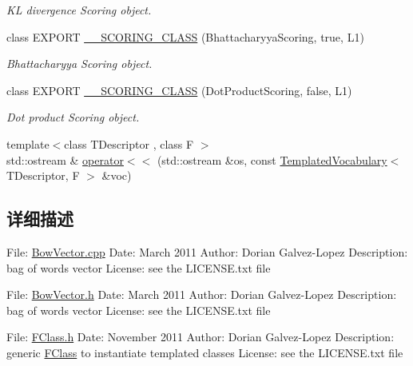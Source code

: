\begin{DoxyCompactItemize}
\begin{DoxyCompactList}\small\item\em K\-L divergence Scoring object. \end{DoxyCompactList}\item 
\hypertarget{namespaceDBoW2_a7135fab6a887afb7d2b4e6254b4875ea}{class E\-X\-P\-O\-R\-T \hyperlink{namespaceDBoW2_a7135fab6a887afb7d2b4e6254b4875ea}{\-\_\-\-\_\-\-S\-C\-O\-R\-I\-N\-G\-\_\-\-C\-L\-A\-S\-S} (Bhattacharyya\-Scoring, true, L1)}\label{namespaceDBoW2_a7135fab6a887afb7d2b4e6254b4875ea}

\begin{DoxyCompactList}\small\item\em Bhattacharyya Scoring object. \end{DoxyCompactList}\item 
\hypertarget{namespaceDBoW2_a8b3715c76bccab82aa18804b6b7dc1ba}{class E\-X\-P\-O\-R\-T \hyperlink{namespaceDBoW2_a8b3715c76bccab82aa18804b6b7dc1ba}{\-\_\-\-\_\-\-S\-C\-O\-R\-I\-N\-G\-\_\-\-C\-L\-A\-S\-S} (Dot\-Product\-Scoring, false, L1)}\label{namespaceDBoW2_a8b3715c76bccab82aa18804b6b7dc1ba}

\begin{DoxyCompactList}\small\item\em Dot product Scoring object. \end{DoxyCompactList}\item 
{\footnotesize template$<$class T\-Descriptor , class F $>$ }\\std\-::ostream \& \hyperlink{namespaceDBoW2_aecdf616fe16d2cf09f521a603b9d43f1}{operator$<$$<$} (std\-::ostream \&os, const \hyperlink{classDBoW2_1_1TemplatedVocabulary}{Templated\-Vocabulary}$<$ T\-Descriptor, F $>$ \&voc)
\end{DoxyCompactItemize}


\subsection{详细描述}
File\-: \hyperlink{BowVector_8cpp_source}{Bow\-Vector.\-cpp} Date\-: March 2011 Author\-: Dorian Galvez-\/\-Lopez Description\-: bag of words vector License\-: see the L\-I\-C\-E\-N\-S\-E.\-txt file

File\-: \hyperlink{BowVector_8h_source}{Bow\-Vector.\-h} Date\-: March 2011 Author\-: Dorian Galvez-\/\-Lopez Description\-: bag of words vector License\-: see the L\-I\-C\-E\-N\-S\-E.\-txt file

File\-: \hyperlink{FClass_8h_source}{F\-Class.\-h} Date\-: November 2011 Author\-: Dorian Galvez-\/\-Lopez Description\-: generic \hyperlink{classDBoW2_1_1FClass}{F\-Class} to instantiate templated classes License\-: see the L\-I\-C\-E\-N\-S\-E.\-txt file

